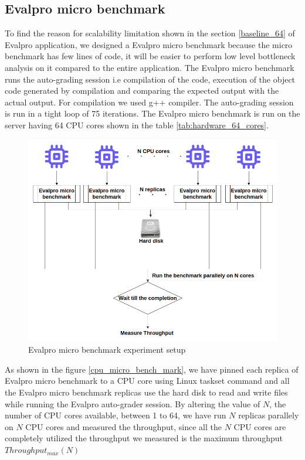 \documentclass[sigconf]{acmart}
\begin{document}
\subsection{Evalpro micro benchmark}\label{evalpro_micro_benchmark_section}
To find the reason for scalability limitation shown in the section \ref{baseline_64} of Evalpro application, we designed a Evalpro micro benchmark because the micro benchmark has few lines of code, it will be easier to perform low level bottleneck analysis on it  compared to the entire application. The  Evalpro micro benchmark runs the auto-grading session i.e compilation of the code, execution of the object code generated by compilation and comparing the expected output with  the actual output. For compilation we used g++ compiler. The auto-grading session is run in a tight loop of 75 iterations. The Evalpro micro benchmark is run on the server having 64 CPU cores shown in the table \ref{tab:hardware_64_cores}.
\begin{figure}[!htb]
  \centering
  \includegraphics[width=\linewidth]{Pictures/evalpro_micro_benchmark.png}
  \caption{Evalpro micro benchmark experiment setup}
  \label{evalpro_micro_bench_mark}
\end{figure}

As shown in the figure \ref{cpu_micro_bench_mark}, we have pinned each replica of Evalpro micro benchmark to a CPU core using Linux taskset command and all the Evalpro micro benchmark replicas use the hard disk to read and write files while running the Evalpro auto-grader session. By altering the value of $N$, the number of CPU cores available, between 1 to 64, we have run $N$ replicas parallely on $N$ CPU cores and measured the throughput, since all the $N$ CPU cores are completely utilized the throughput we measured is the maximum throughput $Throughput_{max}(N)$
\end{document}
